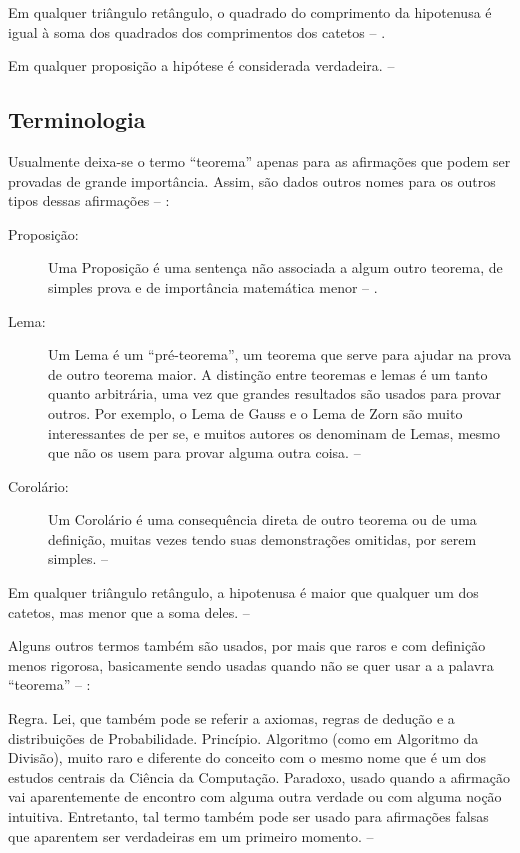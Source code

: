\begin{teorema}
    Em qualquer triângulo retângulo, o quadrado do comprimento da hipotenusa é igual à soma dos quadrados dos comprimentos dos catetos -- \showfont.
\end{teorema}


\begin{proposicao}
    Em qualquer proposição a hipótese é considerada verdadeira. -- \showfont
\end{proposicao}


\subsection{Terminologia}

Usualmente deixa-se o termo ``teorema'' apenas para as afirmações que podem ser provadas de grande importância. Assim, são dados outros nomes para os outros tipos dessas afirmações -- \showfont:

\begin{description}
    \item[Proposição:] Uma Proposição é uma sentença não associada a algum outro teorema, de simples prova e de importância matemática menor -- \showfont.
    \item[Lema:] Um Lema é um ``pré-teorema'', um teorema que serve para ajudar na prova de outro teorema maior. A distinção entre teoremas e lemas é um tanto quanto arbitrária, uma vez que grandes resultados são usados para provar outros. Por exemplo, o Lema de Gauss e o Lema de Zorn são muito interessantes de per se, e muitos autores os denominam de Lemas, mesmo que não os usem para provar alguma outra coisa. -- \showfont
    \item[Corolário:] Um Corolário é uma consequência direta de outro teorema ou de uma definição, muitas vezes tendo suas demonstrações omitidas, por serem simples. -- \showfont
\end{description}


\begin{corolario}
    Em qualquer triângulo retângulo, a hipotenusa é maior que qualquer um dos catetos, mas menor que a soma deles. -- \showfont
\end{corolario}

Alguns outros termos também são usados, por mais que raros e com definição menos rigorosa, basicamente sendo usadas quando não se quer usar a a palavra ``teorema'' -- \showfont:

Regra.
Lei, que também pode se referir a axiomas, regras de dedução e a distribuições de Probabilidade.
Princípio.
Algoritmo (como em Algoritmo da Divisão), muito raro e diferente do conceito com o mesmo nome que é um dos estudos centrais da Ciência da Computação.
Paradoxo, usado quando a afirmação vai aparentemente de encontro com alguma outra verdade ou com alguma noção intuitiva. Entretanto, tal termo também pode ser usado para afirmações falsas que aparentem ser verdadeiras em um primeiro momento. -- \showfont

